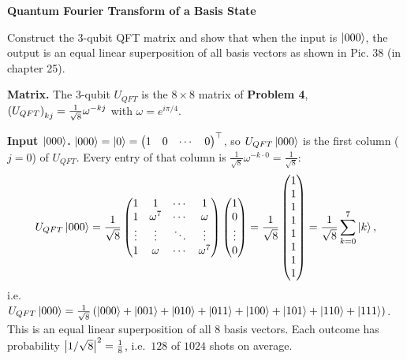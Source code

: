 \documentclass[a4paper, 10pt]{article}
\begin{document}
\begin{problem}
\textbf{Quantum Fourier Transform of a Basis State}
\par Construct the 3-qubit QFT matrix and show that when the input is \( \ket{000} \),
the output is an equal linear superposition of all basis vectors as shown in Pic. 38 (in chapter 25).
\end{problem}

\begin{solution}
	\noindent \textbf{Matrix.} The 3-qubit \( U_{QFT} \) is the \( 8 \times 8 \) matrix of \textbf{Problem 4}, \( \left(U_{QFT}\right)_{kj} = \tfrac{1}{\sqrt{8}}\omega^{-kj} \) with \( \omega = e^{i\pi/4} \).

	\myspace

	\noindent \textbf{Input \( \ket{000} \).} \( \ket{000} = \ket{0} = \begin{pmatrix} 1 & 0 & \cdots & 0 \end{pmatrix}^{\top} \), so \( U_{QFT}\ket{000} \) is the first column (\( j = 0 \)) of \( U_{QFT} \). Every entry of that column is \( \tfrac{1}{\sqrt{8}}\omega^{-k \cdot 0} = \tfrac{1}{\sqrt{8}} \):
	\[
		U_{QFT}\ket{000} = \frac{1}{\sqrt{8}}\begin{pmatrix}
			1 & 1        & \cdots & 1        \\
			1 & \omega^7 & \cdots & \omega   \\
			\vdots & \vdots & \ddots & \vdots \\
			1 & \omega   & \cdots & \omega^7
		\end{pmatrix}\begin{pmatrix} 1 \\ 0 \\ \vdots \\ 0 \end{pmatrix}
		= \frac{1}{\sqrt{8}}\begin{pmatrix} 1 \\ 1 \\ 1 \\ 1 \\ 1 \\ 1 \\ 1 \\ 1 \end{pmatrix}
		= \frac{1}{\sqrt{8}}\sum_{k = 0}^{7}\ket{k},
	\]
	i.e.\ \( U_{QFT}\ket{000} = \tfrac{1}{\sqrt{8}}\left(\ket{000} + \ket{001} + \ket{010} + \ket{011} + \ket{100} + \ket{101} + \ket{110} + \ket{111}\right) \).
	This is an equal linear superposition of all 8 basis vectors. Each outcome has probability \( \left|1/\sqrt{8}\right|^2 = \tfrac{1}{8} \), i.e.\ \( 128 \) of \( 1024 \) shots on average.


\end{solution}
\end{document}
